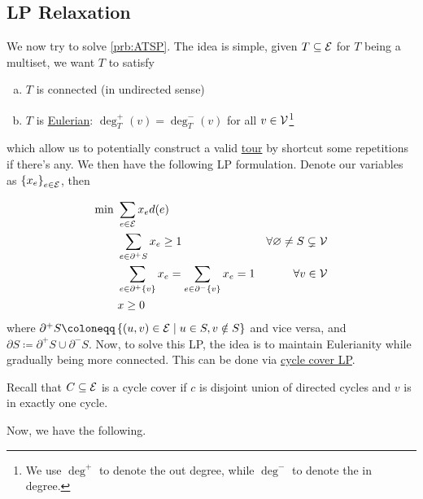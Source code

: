 \subsection{LP Relaxation}
We now try to solve \autoref{prb:ATSP}. The idea is simple, given \(T\subseteq \mathcal{\MakeUppercase{e}} \) for \(T\) being a multiset, we want \(T\) to satisfy
\begin{enumerate}[(a)]
	\item \(T\) is connected (in undirected sense)
	\item \(T\) is \href{https://en.wikipedia.org/wiki/Eulerian_path}{Eulerian}: \(\deg_T^+(v) = \deg_T^-(v)\) for all \(v\in \mathcal{\MakeUppercase{v}} \)\footnote{We use \(\deg^+\) to denote the out degree, while \(\deg^-\) to denote the in degree.}
\end{enumerate}
which allow us to potentially construct a valid \hyperref[def:tour]{tour} by shortcut some repetitions if there's any. We then have the following LP formulation. Denote our variables as \(\left\{ x_e \right\} _{e\in \mathcal{\MakeUppercase{e}} }\), then

\begin{align*}
	\min~ & \sum_{e\in \mathcal{\MakeUppercase{e}} } x_e d(e)                                                                                             \\
	      & \sum_{e\in \partial ^+ S} x_e \geq 1                                      & \forall \varnothing \neq S \subsetneq \mathcal{\MakeUppercase{v}} \\
	      & \sum_{e\in \partial ^+ \{v\}} x_e = \sum_{e\in \partial ^- \{v\}} x_e = 1 & \forall v\in \mathcal{\MakeUppercase{v}}                          \\
	      & x \geq 0
\end{align*}
where \(\partial ^+ S\coloneqq \left\{ (u, v)\in \mathcal{\MakeUppercase{e}} \mid u\in S, v \notin S \right\} \) and vice versa, and \(\partial S\coloneqq \partial ^+S \cup \partial ^-S\). Now, to solve this LP, the idea is to maintain Eulerianity while gradually being more connected. This can be done via \hyperref[subsec:cycle-covering-LP]{cycle cover LP}.

\begin{prev}
	Recall that \(C \subseteq \mathcal{\MakeUppercase{e}} \) is a cycle cover if \(c\) is disjoint union of directed cycles and \(v\) is in exactly one cycle.
\end{prev}

Now, we have the following.

